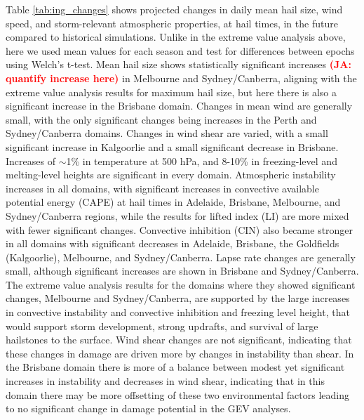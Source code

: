\documentclass[]{agujournal2019}\usepackage[]{graphicx}\usepackage[]{xcolor}
\newcommand*{\todo}[1]{\textbf{\textcolor{red}{(#1)}}}
\begin{document}
Table \ref{tab:ing_changes} shows projected changes in daily mean hail size,
wind speed, and storm-relevant atmospheric properties, at hail times, in the
future compared to historical simulations. Unlike in the extreme  value analysis
above, here we used mean values for each season and test for differences between
epochs using Welch's t-test. Mean hail size shows statistically significant
increases \todo{JA: quantify increase here} in Melbourne and Sydney/Canberra,
aligning with the extreme value analysis results for maximum hail size, but here
there is also a significant increase in the Brisbane domain. Changes in mean
wind are generally small, with the only significant changes being increases in
the Perth and Sydney/Canberra domains. Changes in wind shear are varied, with a
small significant increase in Kalgoorlie and a small significant decrease in
Brisbane. Increases of $\sim$1\% in temperature at 500 hPa, and 8-10\% in
freezing-level and melting-level heights are significant in every domain.
Atmospheric instability increases in all domains, with significant increases in
convective available potential energy (CAPE) at hail times in Adelaide,
Brisbane, Melbourne, and Sydney/Canberra regions, while the results for lifted
index (LI) are more mixed with fewer significant changes. Convective inhibition
(CIN) also became stronger in all domains with significant decreases in
Adelaide, Brisbane, the Goldfields (Kalgoorlie), Melbourne, and Sydney/Canberra.
Lapse rate changes are generally small, although significant increases are shown
in Brisbane and Sydney/Canberra. The extreme value analysis results for the
domains where they showed significant changes, Melbourne and Sydney/Canberra,
are supported by the large increases in convective instability and convective
inhibition and freezing level height, that would support storm development,
strong updrafts, and survival of large hailstones to the surface. Wind shear
changes are not significant, indicating that these changes in damage are driven
more by changes in instability than shear. In the Brisbane domain there is more
of a balance between modest yet significant increases in instability and
decreases in wind shear, indicating that in this domain there may be more
offsetting of these two environmental factors leading to no significant change
in damage potential in the GEV analyses.
\end{document}

